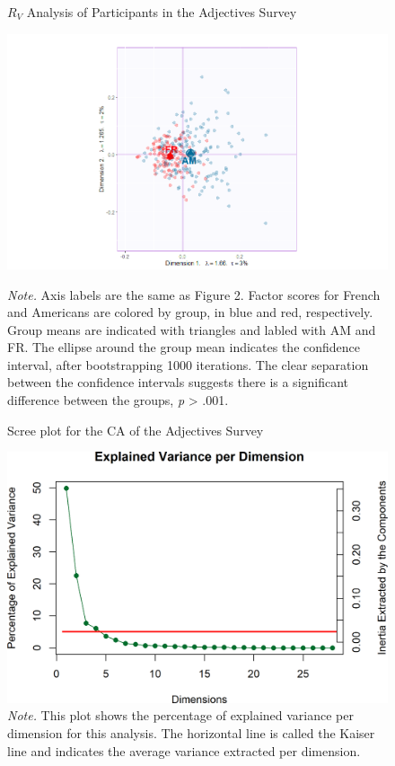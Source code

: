 \documentclass[
  english,
  man,floatsintext]{apa6}
\begin{document}
\begin{figure}   
  \centering  
  \caption{${R_V}$ Analysis of Participants in the Adjectives Survey}
    \includegraphics[width=0.7\columnwidth]{./Music-Descriptor-Space_files/figure-latex/apartrvmap.png}
  \label{fig:map4RVA}
  \caption*{\footnotesize \textit{Note.} Axis labels are the same as Figure 2. Factor scores for French and Americans are colored by group, in blue and red, respectively. Group means are indicated with triangles and labled with AM and FR. The ellipse around the group mean indicates the confidence interval, after bootstrapping 1000 iterations. The clear separation between the confidence intervals suggests there is a significant difference between the groups, \textit{p} > .001.}
\end{figure}

\begin{figure}  
  \begin{center}
  \caption{Scree plot for the CA of the Adjectives Survey}
    \includegraphics{./Music-Descriptor-Space_files/figure-latex/scree4descriptors-1.png}
  \caption*{\footnotesize \textit{Note.} This plot shows the percentage of explained variance per dimension for this analysis. The horizontal line is called the Kaiser line and indicates the average variance extracted per dimension.}\label{fig:scree4descriptors}  
 \end{center}
\end{figure}
\end{document}
